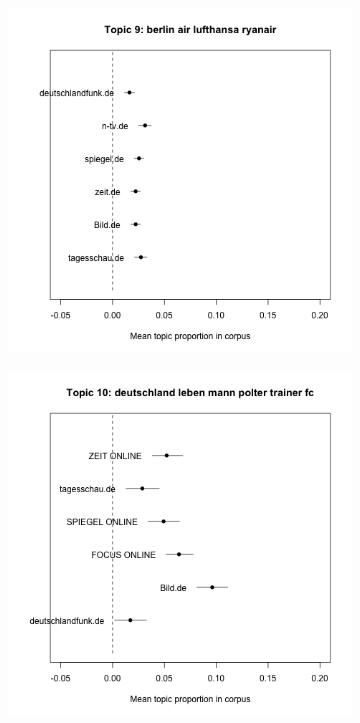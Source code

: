 \documentclass[12pt,a4paper,notitlepage]{article}
\begin{document}
\begin{figure}[H]
\begin{center}
\begin{subfigure}[normla]{0.2\textwidth}
		\end{subfigure}
		\begin{subfigure}[normla]{0.2\textwidth}
			\includegraphics[width=\textwidth]{../figs/estimate_effect9.png}
		\end{subfigure}
		\begin{subfigure}[normla]{0.2\textwidth}
			\includegraphics[width=\textwidth]{../figs/estimate_effect10.png}

\end{subfigure}
\end{center}
\end{figure}
\end{document}
